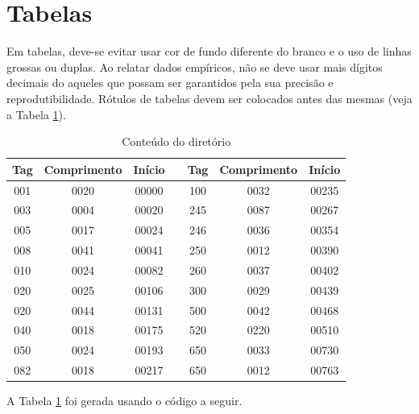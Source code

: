 \section{Tabelas}
\label{sec:tabs} 

Em tabelas, deve-se evitar usar cor de fundo diferente do branco e o uso de linhas grossas ou duplas. Ao relatar dados empíricos, não se deve usar mais dígitos decimais do aqueles que possam ser garantidos pela sua precisão e reprodutibilidade. Rótulos de tabelas devem ser colocados
antes das mesmas (veja a Tabela \ref{tab:MarcMNem}).

\begin{table}[ht!]
\caption{Conteúdo do diretório}
\label{tab:MarcMNem} 
\begin{center}
\begin{tabular}{c|c|c|c|c|c|c}
\hline Tag & Comprimento & Início &   & Tag & Comprimento & Início \\ 
\hline 001 & 0020 & 00000 && 100 & 0032 & 00235\\ 
\hline 003 & 0004 & 00020 && 245 & 0087 & 00267\\ 
\hline 005 & 0017 & 00024 && 246 & 0036 & 00354\\ 
\hline 008 & 0041 & 00041 && 250 & 0012 & 00390\\ 
\hline 010 & 0024 & 00082 && 260 & 0037 & 00402\\ 
\hline 020 & 0025 & 00106 && 300 & 0029 & 00439\\ 
\hline 020 & 0044 & 00131 && 500 & 0042 & 00468\\ 
\hline 040 & 0018 & 00175 && 520 & 0220 & 00510\\ 
\hline 050 & 0024 & 00193 && 650 & 0033 & 00730\\ 
\hline 082 & 0018 & 00217 && 650 & 0012 & 00763\\ 
\hline 
\end{tabular} 
\end{center}
\end{table}

A Tabela \ref{tab:MarcMNem} foi gerada usando o código a seguir.

